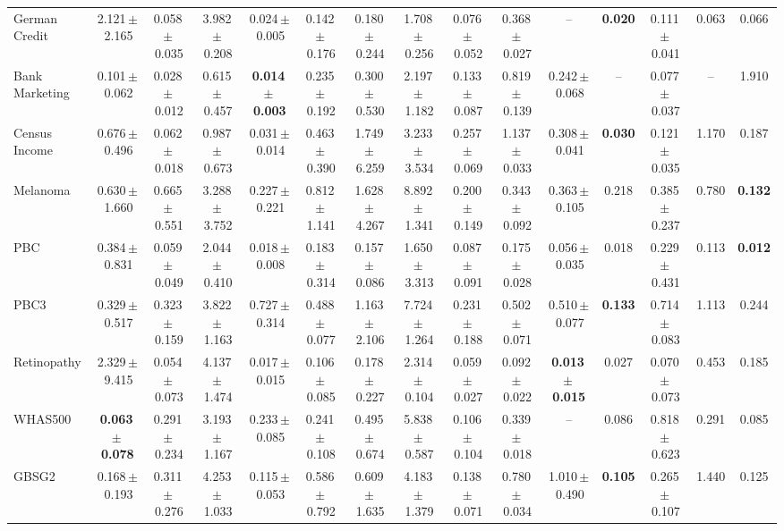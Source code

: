 \documentclass[8pt]{extarticle}
\begin{document}
\begin{longtable}{l*{14}{c}}
German Credit & 2.121\,$\pm$\,2.165 & 0.058\,$\pm$\,0.035 & 3.982\,$\pm$\,0.208 & 0.024\,$\pm$\,0.005 & 0.142\,$\pm$\,0.176 & 0.180\,$\pm$\,0.244 & 1.708\,$\pm$\,0.256 & 0.076\,$\pm$\,0.052 & 0.368\,$\pm$\,0.027 & -- & \textbf{0.020} & 0.111\,$\pm$\,0.041 & 0.063 & 0.066 \\
Bank Marketing & 0.101\,$\pm$\,0.062 & 0.028\,$\pm$\,0.012 & 0.615\,$\pm$\,0.457 & \textbf{0.014\,$\pm$\,0.003} & 0.235\,$\pm$\,0.192 & 0.300\,$\pm$\,0.530 & 2.197\,$\pm$\,1.182 & 0.133\,$\pm$\,0.087 & 0.819\,$\pm$\,0.139 & 0.242\,$\pm$\,0.068 & -- & 0.077\,$\pm$\,0.037 & -- & 1.910 \\
Census Income & 0.676\,$\pm$\,0.496 & 0.062\,$\pm$\,0.018 & 0.987\,$\pm$\,0.673 & 0.031\,$\pm$\,0.014 & 0.463\,$\pm$\,0.390 & 1.749\,$\pm$\,6.259 & 3.233\,$\pm$\,3.534 & 0.257\,$\pm$\,0.069 & 1.137\,$\pm$\,0.033 & 0.308\,$\pm$\,0.041 & \textbf{0.030} & 0.121\,$\pm$\,0.035 & 1.170 & 0.187 \\
Melanoma & 0.630\,$\pm$\,1.660 & 0.665\,$\pm$\,0.551 & 3.288\,$\pm$\,3.752 & 0.227\,$\pm$\,0.221 & 0.812\,$\pm$\,1.141 & 1.628\,$\pm$\,4.267 & 8.892\,$\pm$\,1.341 & 0.200\,$\pm$\,0.149 & 0.343\,$\pm$\,0.092 & 0.363\,$\pm$\,0.105 & 0.218 & 0.385\,$\pm$\,0.237 & 0.780 & \textbf{0.132} \\
PBC & 0.384\,$\pm$\,0.831 & 0.059\,$\pm$\,0.049 & 2.044\,$\pm$\,0.410 & 0.018\,$\pm$\,0.008 & 0.183\,$\pm$\,0.314 & 0.157\,$\pm$\,0.086 & 1.650\,$\pm$\,3.313 & 0.087\,$\pm$\,0.091 & 0.175\,$\pm$\,0.028 & 0.056\,$\pm$\,0.035 & 0.018 & 0.229\,$\pm$\,0.431 & 0.113 & \textbf{0.012} \\
PBC3 & 0.329\,$\pm$\,0.517 & 0.323\,$\pm$\,0.159 & 3.822\,$\pm$\,1.163 & 0.727\,$\pm$\,0.314 & 0.488\,$\pm$\,0.077 & 1.163\,$\pm$\,2.106 & 7.724\,$\pm$\,1.264 & 0.231\,$\pm$\,0.188 & 0.502\,$\pm$\,0.071 & 0.510\,$\pm$\,0.077 & \textbf{0.133} & 0.714\,$\pm$\,0.083 & 1.113 & 0.244 \\
Retinopathy & 2.329\,$\pm$\,9.415 & 0.054\,$\pm$\,0.073 & 4.137\,$\pm$\,1.474 & 0.017\,$\pm$\,0.015 & 0.106\,$\pm$\,0.085 & 0.178\,$\pm$\,0.227 & 2.314\,$\pm$\,0.104 & 0.059\,$\pm$\,0.027 & 0.092\,$\pm$\,0.022 & \textbf{0.013\,$\pm$\,0.015} & 0.027 & 0.070\,$\pm$\,0.073 & 0.453 & 0.185 \\
WHAS500 & \textbf{0.063\,$\pm$\,0.078} & 0.291\,$\pm$\,0.234 & 3.193\,$\pm$\,1.167 & 0.233\,$\pm$\,0.085 & 0.241\,$\pm$\,0.108 & 0.495\,$\pm$\,0.674 & 5.838\,$\pm$\,0.587 & 0.106\,$\pm$\,0.104 & 0.339\,$\pm$\,0.018 & -- & 0.086 & 0.818\,$\pm$\,0.623 & 0.291 & 0.085 \\
GBSG2 & 0.168\,$\pm$\,0.193 & 0.311\,$\pm$\,0.276 & 4.253\,$\pm$\,1.033 & 0.115\,$\pm$\,0.053 & 0.586\,$\pm$\,0.792 & 0.609\,$\pm$\,1.635 & 4.183\,$\pm$\,1.379 & 0.138\,$\pm$\,0.071 & 0.780\,$\pm$\,0.034 & 1.010\,$\pm$\,0.490 & \textbf{0.105} & 0.265\,$\pm$\,0.107 & 1.440 & 0.125 \\

\end{longtable}
\end{document}
